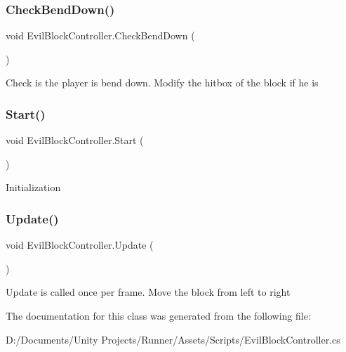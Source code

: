 \subsubsection{\texorpdfstring{Check\+Bend\+Down()}{CheckBendDown()}}
{\footnotesize\ttfamily void Evil\+Block\+Controller.\+Check\+Bend\+Down (\begin{DoxyParamCaption}{ }\end{DoxyParamCaption})\hspace{0.3cm}{\ttfamily [private]}}

Check is the player is bend down. Modify the hitbox of the block if he is \mbox{\label{class_evil_block_controller_a886850dc23ca46aa4f52733f8b5416b3}} 
\subsubsection{\texorpdfstring{Start()}{Start()}}
{\footnotesize\ttfamily void Evil\+Block\+Controller.\+Start (\begin{DoxyParamCaption}{ }\end{DoxyParamCaption})\hspace{0.3cm}{\ttfamily [private]}}

Initialization \mbox{\label{class_evil_block_controller_aec96a96d09990cc28e52383ad41d9e12}} 
\subsubsection{\texorpdfstring{Update()}{Update()}}
{\footnotesize\ttfamily void Evil\+Block\+Controller.\+Update (\begin{DoxyParamCaption}{ }\end{DoxyParamCaption})\hspace{0.3cm}{\ttfamily [private]}}

Update is called once per frame. Move the block from left to right 

The documentation for this class was generated from the following file\+:\begin{DoxyCompactItemize}
\item 
D\+:/\+Documents/\+Unity Projects/\+Runner/\+Assets/\+Scripts/Evil\+Block\+Controller.\+cs\end{DoxyCompactItemize}
